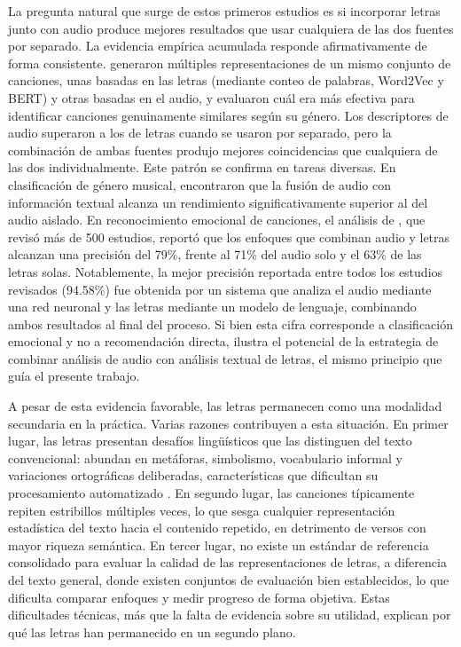 La pregunta natural que surge de estos primeros estudios es si incorporar letras junto con audio produce mejores resultados que usar cualquiera de las dos fuentes por separado. La evidencia empírica acumulada responde afirmativamente de forma consistente. \textcite{vystrcilova_2020_lyrics_audio} generaron múltiples representaciones de un mismo conjunto de canciones, unas basadas en las letras (mediante conteo de palabras, Word2Vec y BERT) y otras basadas en el audio, y evaluaron cuál era más efectiva para identificar canciones genuinamente similares según su género. Los descriptores de audio superaron a los de letras cuando se usaron por separado, pero la combinación de ambas fuentes produjo mejores coincidencias que cualquiera de las dos individualmente. Este patrón se confirma en tareas diversas. En clasificación de género musical, \textcite{oramas_2018_multimodal_genre} encontraron que la fusión de audio con información textual alcanza un rendimiento significativamente superior al del audio aislado. En reconocimiento emocional de canciones, el análisis de \textcite{liyanarachchi_2025_multimodal_mer}, que revisó más de 500 estudios, reportó que los enfoques que combinan audio y letras alcanzan una precisión del 79\%, frente al 71\% del audio solo y el 63\% de las letras solas. Notablemente, la mejor precisión reportada entre todos los estudios revisados (94.58\%) fue obtenida por un sistema que analiza el audio mediante una red neuronal y las letras mediante un modelo de lenguaje, combinando ambos resultados al final del proceso. Si bien esta cifra corresponde a clasificación emocional y no a recomendación directa, ilustra el potencial de la estrategia de combinar análisis de audio con análisis textual de letras, el mismo principio que guía el presente trabajo.

A pesar de esta evidencia favorable, las letras permanecen como una modalidad secundaria en la práctica. Varias razones contribuyen a esta situación. En primer lugar, las letras presentan desafíos lingüísticos que las distinguen del texto convencional: abundan en metáforas, simbolismo, vocabulario informal y variaciones ortográficas deliberadas, características que dificultan su procesamiento automatizado \parencite{watanabe_2020_lip}. En segundo lugar, las canciones típicamente repiten estribillos múltiples veces, lo que sesga cualquier representación estadística del texto hacia el contenido repetido, en detrimento de versos con mayor riqueza semántica. En tercer lugar, no existe un estándar de referencia consolidado para evaluar la calidad de las representaciones de letras, a diferencia del texto general, donde existen conjuntos de evaluación bien establecidos, lo que dificulta comparar enfoques y medir progreso de forma objetiva. Estas dificultades técnicas, más que la falta de evidencia sobre su utilidad, explican por qué las letras han permanecido en un segundo plano.

